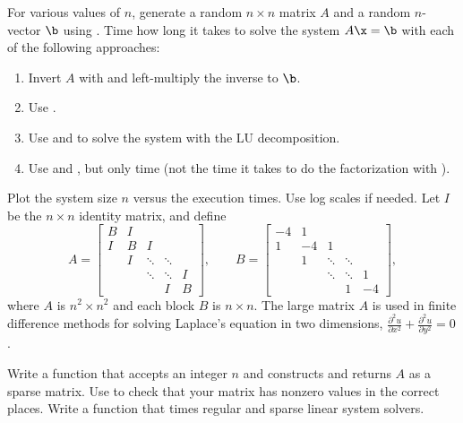 For various values of $n$, generate a random $n \times n$ matrix $A$ and a random $n$-vector $\b$ using .
Time how long it takes to solve the system $A\x = \b$ with each of the following approaches:
%
\begin{enumerate}
\item Invert $A$ with  and left-multiply the inverse to $\b$.
\item Use .
\item Use  and  to solve the system with the LU decomposition.
\item Use  and , but only time  (not the time it takes to do the factorization with ).
\end{enumerate}
%
Plot the system size $n$ versus the execution times.
Use log scales if needed.
\label{prob:linsystems-timing1}
Let $I$ be the $n\times n$ identity matrix, and define
\[
A =\left[\begin{array}{ccccc}
B & I &      &        & \\
I & B &  I   &        & \\
  & I & \ddots & \ddots & \\
  &   & \ddots & \ddots & I \\
  &   &        &    I   & B
\end{array}\right],
\qquad
B = \left[\begin{array}{rrrrr}
-4 &  1 &      &        & \\
 1 & -4 &  1   &        & \\
   &  1 & \ddots & \ddots & \\
   &    & \ddots & \ddots & 1 \\
   &    &        &    1   & -4
\end{array}\right],
\]
where $A$ is $n^2\times n^2$ and each block $B$ is $n\times n$.
The large matrix $A$ is used in finite difference methods for solving Laplace's equation in two dimensions, $\frac{\partial^2u}{\partial x^2} + \frac{\partial^2u}{\partial y^2} = 0$.

Write a function that accepts an integer $n$ and constructs and returns $A$ as a sparse matrix.
Use  to check that your matrix has nonzero values in the correct places.
\label{prob:sparse-construction}
Write a function that times regular and sparse linear system solvers.


